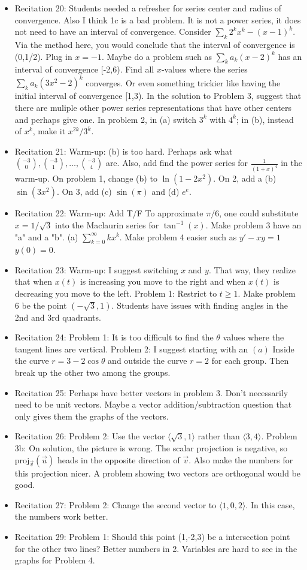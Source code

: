 \documentclass{article}
\begin{document}
\begin{itemize}
\item Recitation 20: Students needed a refresher for series center and radius of convergence. Also I think 1c is a bad problem. It is not a power series, it does not need to have an interval of convergence. Consider $\sum_k 2^k x^k - (x-1)^k$. Via the method here, you would conclude that the interval of convergence is (0,1/2). Plug in $x=-1$. Maybe do a problem such as $\sum_k a_k (x-2)^k$ has an interval of convergence [-2,6). Find all $x$-values where the series $\sum_k a_k (3x^2-2)^k$ converges. Or even something trickier like having the initial interval of convergence [1,3).  In the solution to Problem 3, suggest that there are muliple other power series representations that have other centers and perhaps give one. In problem 2, in (a) switch $3^k$ with $4^k$; in (b), instead of $x^k$, make it $x^{2k}/3^k$. 
\item Recitation 21: Warm-up: (b) is too hard. Perhaps ask what ${-3 \choose 0}, {-3 \choose 1}, \ldots, {-3\choose 4}$ are. Also, add find the power series for $\frac{1}{(1+x)^4}$ in the warm-up. On problem 1, change (b) to $\ln (1-2x^2)$. On 2, add a (b) $\sin(3x^2)$. On 3, add (c) $\sin (\pi)$ and (d) $e^e$. 
\item Recitation 22: Warm-up: Add T/F To approximate $\pi/6$, one could substitute $x=1/\sqrt{3}$ into the Maclaurin series for $\tan^{-1}(x)$. Make problem 3 have an "a" and a "b". (a) $\sum_{k=0}^{\infty} k x^k$. Make problem 4 easier such as $y'-xy=1$ $y(0)=0$. 
\item Recitation 23: Warm-up: I suggest switching $x$ and $y$. That way, they realize that when $x(t)$ is increasing you move to the right and when $x(t)$ is decreasing you move to the left. Problem 1: Restrict to $t \geq 1$. Make problem 6 be the point $(-\sqrt{3}, 1)$. Students have issues with finding angles in the 2nd and 3rd quadrants.
\item Recitation 24: Problem 1: It is too difficult to find the $\theta$ values where the tangent lines are vertical. Problem 2: I suggest starting with an $(a)$ Inside the curve $r=3-2\cos \theta$ and outside the curve $r=2$ for each group. Then break up the other two among the groups. 
\item Recitation 25: Perhaps have better vectors in problem 3. Don't necessarily need to be unit vectors. Maybe a vector addition/subtraction question that only gives them the graphs of the vectors. 
\item Recitation 26: Problem 2: Use the vector $\langle \sqrt{3}, 1 \rangle$ rather than $\langle 3, 4 \rangle$. Problem 3b: On solution, the picture is wrong. The scalar projection is negative, so $\text{proj}_{\vec{v}}(\vec{u})$ heads in the opposite direction of $\vec{v}$. Also make the numbers for this projection nicer. A problem showing two vectors are orthogonal would be good.
\item Recitation 27: Problem 2: Change the second vector to $\langle 1, 0, 2 \rangle$. In this case, the numbers work better. 
\item Recitation 29: Problem 1: Should this point (1,-2,3) be a intersection point for the other two lines? Better numbers in 2. Variables are hard to see in the graphs for Problem 4. 
\end{itemize}
\end{document}
